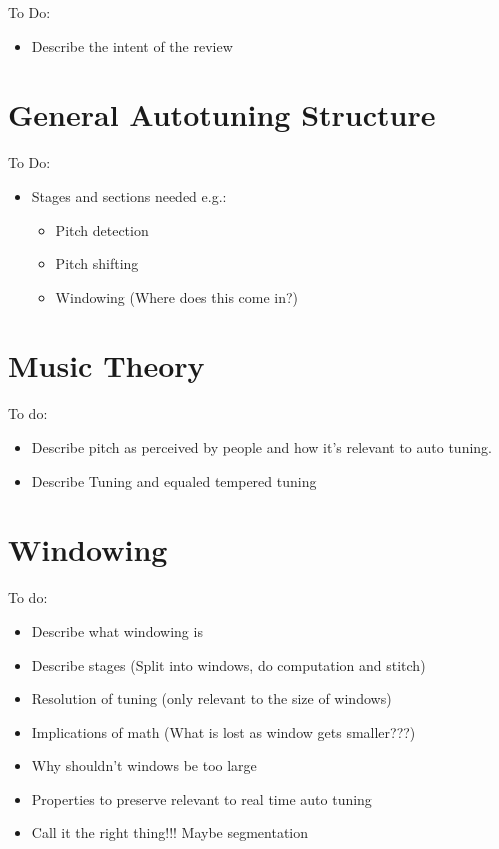 
\color{red}
To Do:
\begin{itemize}
	\item Describe the intent of the review
\end{itemize}
\color{black}

\section{General Autotuning Structure}

\color{red}
To Do:
\begin{itemize}
	\item Stages and sections needed e.g.:
	\begin{itemize}
		\item Pitch detection
		\item Pitch shifting
		\item Windowing (Where does this come in?)
	\end{itemize}
\end{itemize}
\color{black}

\section{Music Theory}

\color{red}
To do:
\begin{itemize}
	\item Describe pitch as perceived by people and how it's relevant to auto tuning.
	\item Describe Tuning and equaled tempered tuning
\end{itemize}
\color{black}

\section{Windowing}

\color{red}
To do:
\begin{itemize}
	\item Describe what windowing is
	\item Describe stages (Split into windows, do computation and stitch)
	\item Resolution of tuning (only relevant to the size of windows)
	\item Implications of math (What is lost as window gets smaller???)
	\item Why shouldn't windows be too large
	\item Properties to preserve relevant to real time auto tuning
	\item Call it the right thing!!! Maybe segmentation
\end{itemize}
\color{black}

